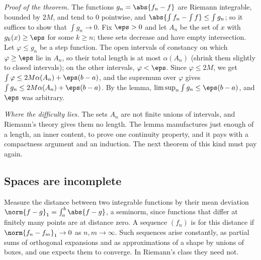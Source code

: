 \begin{refsection}
\begin{aside}
\emph{Proof of the theorem.} The functions $g_n=\abs{f_n-f}$ are Riemann integrable, bounded by $2M$, and tend to $0$ pointwise, and $\abs{\int f_n-\int f}\le\int g_n$; so it suffices to show that $\int g_n\to0$. Fix $\eps>0$ and let $A_n$ be the set of $x$ with $g_k(x)\ge\eps$ for some $k\ge n$; these sets decrease and have empty intersection. Let $\varphi\le g_n$ be a step function. The open intervals of constancy on which $\varphi\ge\eps$ lie in $A_n$, so their total length is at most $\alpha(A_n)$ (shrink them slightly to closed intervals); on the other intervals, $\varphi<\eps$. Since $\varphi\le2M$, we get $\int\varphi\le2M\alpha(A_n)+\eps(b-a)$, and the supremum over $\varphi$ gives $\int g_n\le2M\alpha(A_n)+\eps(b-a)$. By the lemma, $\limsup_n\int g_n\le\eps(b-a)$, and $\eps$ was arbitrary.

\emph{Where the difficulty lies.} The sets $A_n$ are not finite unions of intervals, and Riemann's theory gives them no length. The lemma manufactures just enough of a length, an inner content, to prove one continuity property, and it pays with a compactness argument and an induction. The next theorem of this kind must pay again.
\end{aside}

\subsection{Spaces are incomplete}\label{sec:lebesgue:incomplete}

Measure the distance between two integrable functions by their mean deviation $\norm{f-g}_1=\int_a^b\abs{f-g}$, a seminorm, since functions that differ at finitely many points are at distance zero. A sequence $(f_n)$ is  for this distance if $\norm{f_n-f_m}_1\to0$ as $n,m\to\infty$. Such sequences arise constantly, as partial sums of orthogonal expansions and as approximations of a shape by unions of boxes, and one expects them to converge. In Riemann's class they need not.


\end{refsection}
